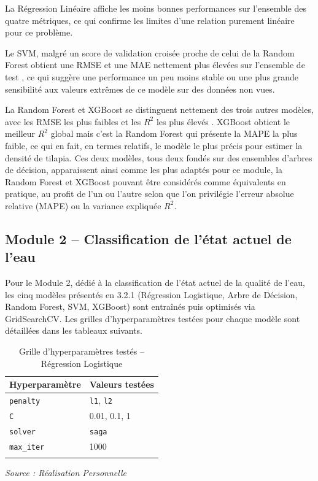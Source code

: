 \documentclass[a4paper,12pt, oneside]{article}
\begin{document}
La Régression Linéaire affiche les moins bonnes performances sur l'ensemble des quatre métriques, ce qui confirme les limites d'une relation purement linéaire pour ce problème.

Le SVM, malgré un score de validation croisée proche de celui de la Random Forest obtient une RMSE et une MAE nettement plus élevées sur l'ensemble de test , ce qui suggère une performance un peu moins stable ou une plus grande sensibilité aux valeurs extrêmes de ce modèle sur des données non vues.

La Random Forest et XGBoost se distinguent nettement des trois autres modèles, avec les RMSE les plus faibles et les $R^2$ les plus élevés . XGBoost obtient le meilleur $R^2$ global mais c'est la Random Forest qui présente la MAPE la plus faible, ce qui en fait, en termes relatifs, le modèle le plus précis pour estimer la densité de tilapia. Ces deux modèles, tous deux fondés sur des ensembles d'arbres de décision, apparaissent ainsi comme les plus adaptés pour ce module, la Random Forest et XGBoost pouvant être considérés comme équivalents en pratique, au profit de l'un ou l'autre selon que l'on privilégie l'erreur absolue relative (MAPE) ou la variance expliquée $R^2$.

\subsection[Classification de l'état actuel de l'eau]{Module 2 -- Classification de l'état actuel de l'eau\\}

Pour le Module 2, dédié à la classification de l'état actuel de la qualité de l'eau, les cinq modèles présentés en 3.2.1 (Régression Logistique, Arbre de Décision, Random Forest, SVM, XGBoost) sont entraînés puis optimisés via GridSearchCV. Les grilles d'hyperparamètres testées pour chaque modèle sont détaillées dans les tableaux suivants.

\begin{longtable}{|p{3.5cm}|p{9.5cm}|}
\hline
\textbf{Hyperparamètre} & \textbf{Valeurs testées} \\
\hline
\texttt{penalty} & \texttt{l1}, \texttt{l2} \\
\hline
\texttt{C} & 0.01, 0.1, 1 \\
\hline
\texttt{solver} & \texttt{saga} \\
\hline
\texttt{max\_iter} & 1000 \\
\hline
\caption{Grille d'hyperparamètres testés -- Régression Logistique} \\
\end{longtable}
\begin{center}
\vspace{-0.85cm}
\textit{Source : Réalisation Personnelle}
\end{center}
\end{document}
